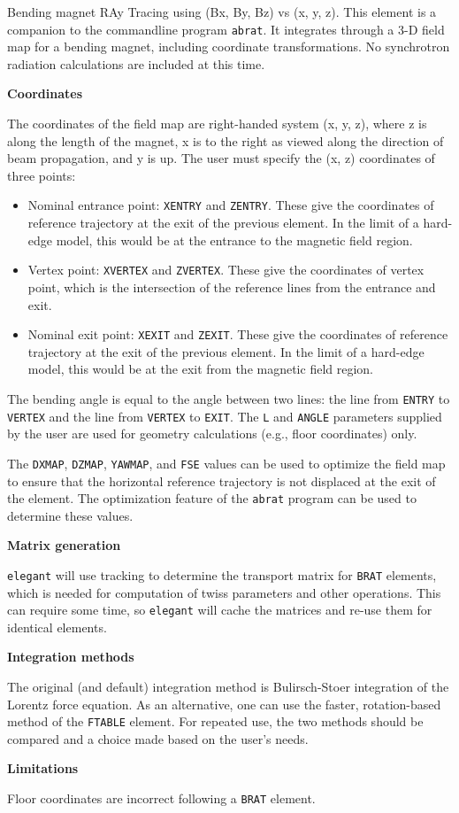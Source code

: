 Bending magnet RAy Tracing using (Bx, By, Bz) vs (x, y, z).
This element is a companion to the commandline program {\tt abrat}.
It integrates through a 3-D field map for a bending magnet, including
coordinate transformations.
No synchrotron radiation calculations are included at this time.

{\bf Coordinates}

The coordinates of the field map are right-handed system (x, y, z), where z is along the length of the magnet, x is 
to the right as viewed along the direction of beam propagation, and y is up.
The user must specify the (x, z) coordinates of three points:
\begin{itemize}
\item Nominal entrance point: \verb|XENTRY| and \verb|ZENTRY|. These give the coordinates of reference trajectory at
  the exit of the previous element. In the limit of a hard-edge model, this would be at the entrance to the magnetic field 
  region.
\item Vertex point: \verb|XVERTEX| and \verb|ZVERTEX|. These give the coordinates of vertex point, which is the intersection
  of the reference lines from the entrance and exit.
\item Nominal exit point: \verb|XEXIT| and \verb|ZEXIT|. These give the coordinates of reference trajectory at
  the exit of the previous element. In the limit of a hard-edge model, this would be at the exit from the magnetic field 
  region.
\end{itemize}
The bending angle is equal to the angle between two lines: the line from \verb|ENTRY| to \verb|VERTEX| and the
line from \verb|VERTEX| to \verb|EXIT|.
The \verb|L| and \verb|ANGLE| parameters supplied by the user are used for geometry calculations (e.g., floor coordinates) only.

The \verb|DXMAP|, \verb|DZMAP|, \verb|YAWMAP|, and \verb|FSE| values can be used to optimize the field map to ensure that
the horizontal reference trajectory is not displaced at the exit of the element.
The optimization feature of the \verb|abrat| program can be used to determine these values.

{\bf Matrix generation}

{\tt elegant} will use tracking to determine the transport matrix for \verb|BRAT| elements, which 
is needed for computation of twiss parameters and other operations.
This can require some time, so {\tt elegant} will cache the matrices and re-use them for
identical elements.

{\bf Integration methods}

The original (and default) integration method is Bulirsch-Stoer integration of the Lorentz force equation.
As an alternative, one can use the faster, rotation-based method of the \verb|FTABLE| element.
For repeated use, the two methods should be compared and a choice made based on the user's needs.

{\bf Limitations}

Floor coordinates are incorrect following a \verb|BRAT| element.
